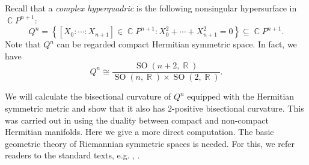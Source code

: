 \documentclass[11pt]{amsart}
\theoremstyle{plain}
\theoremstyle{definition}
\numberwithin{equation}{section}
\DeclareMathOperator{\R}{\mathbb{R}}
\DeclareMathOperator{\C}{\mathbb{C}}
\DeclareMathOperator{\SO}{SO}
\begin{document}
Recall that a \emph{complex hyperquadric} is the following nonsingular hypersurface in $\C P^{n+1}$:
\[Q^n=\left\{[X_0:\cdots:X_{n+1}]\in\C P^{n+1}:X_0^2+\cdots+X_{n+1}^2=0\right\}\subseteq \C P^{n+1}.\]
Note that $Q^n$ can be regarded compact Hermitian symmetric space. In fact, we have 
\begin{equation}
    Q^n\cong \frac{\SO(n+2,\R)}{\SO(n,\R)\times\SO(2,\R)}.
\end{equation}

We will calculate the bisectional curvature of $Q^n$ equipped with the Hermitian symmetric metric and show that it also has $2$-positive bisectional curvature. This was carried out in \cite{Siu80} using the duality between compact and non-compact Hermitian manifolds. Here we give a more direct computation. The basic geometric theory of Riemannian symmetric spaces is needed. For this, we refer readers to the standard texts, e.g. \cite[Chapter 8]{Wol11}, \cite{Hel78}.
\end{document}
